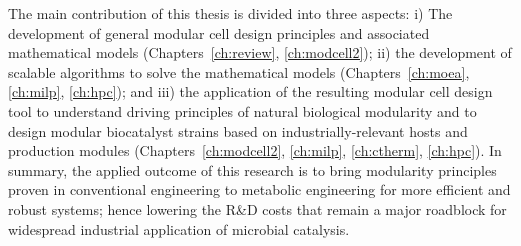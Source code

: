 The main contribution of this thesis is divided into three aspects:
i) The development of general modular cell design principles and associated mathematical models (Chapters~\ref{ch:review}, \ref{ch:modcell2});
ii) the development of scalable algorithms to solve the mathematical models (Chapters~\ref{ch:moea}, \ref{ch:milp}, \ref{ch:hpc});
and iii) the application of the resulting modular cell design tool to understand driving principles of natural biological modularity and to design modular biocatalyst strains based on industrially-relevant hosts and production modules (Chapters~\ref{ch:modcell2}, \ref{ch:milp}, \ref{ch:ctherm}, \ref{ch:hpc}). %
In summary, the applied outcome of this research is to bring modularity principles proven in conventional engineering to metabolic engineering for more efficient and robust systems;
hence lowering the R\&D costs that remain a major roadblock for widespread industrial application of microbial catalysis.



